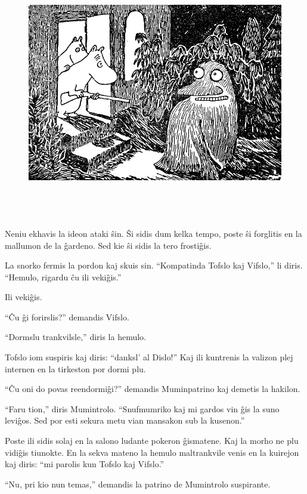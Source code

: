 \begin{figure}[htbp]
\centering
\includegraphics[width=449pt,height=313pt]{_30.jpg}
\caption{}
\label{_30}
\end{figure}

Neniu ekhavis la ideon ataki ŝin. Ŝi sidis dum kelka tempo, poste ŝi forglitis en la mallumon de la ĝardeno. Sed kie ŝi sidis la tero frostiĝis.

La snorko fermis la pordon kaj skuis sin. ``Kompatinda Tofslo kaj Vifslo,'' li diris. ``Hemulo, rigardu ĉu ili vekiĝis.''

Ili vekiĝis.

``Ĉu ĝi forirslis?'' demandis Vifslo.

``Dormslu trankvilsle,'' diris la hemulo.

Tofslo iom suspiris kaj diris: ``danksl' al Dislo!'' Kaj ili kuntrenis la valizon plej internen en la tirkeston por dormi plu.

``Ĉu oni do povas reendormiĝi?'' demandis Muminpatrino kaj demetis la hakilon.

``Faru tion,'' diris Mumintrolo. ``Snufmumriko kaj mi gardos vin ĝis la suno leviĝos. Sed por esti sekura metu vian mansakon sub la kusenon.''

Poste ili sidis solaj en la salono ludante pokeron ĝismatene. Kaj la morho ne plu vidiĝis tiunokte.
\sectionbreak
En la sekva mateno la hemulo maltrankvile venis en la kuirejon kaj diris: ``mi parolis kun Tofslo kaj Vifslo.''

``Nu, pri kio nun temas,'' demandis la patrino de Mumintrolo suspirante.


